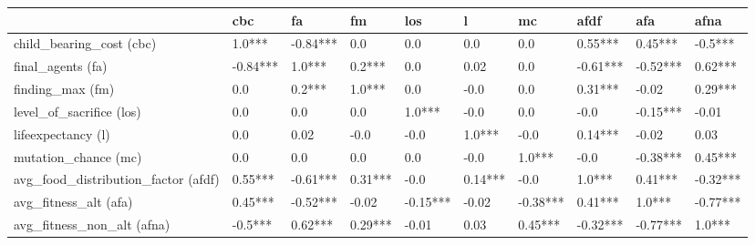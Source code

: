\begin{tabular}{llllllllll}
    \toprule
    {}                                     & cbc      & fa       & fm      & los      & l       & mc       & afdf     & afa      & afna     \\
    \midrule
    child\_bearing\_cost (cbc)             & 1.0***   & -0.84*** & 0.0     & 0.0      & 0.0     & 0.0      & 0.55***  & 0.45***  & -0.5***  \\
    final\_agents (fa)                     & -0.84*** & 1.0***   & 0.2***  & 0.0      & 0.02    & 0.0      & -0.61*** & -0.52*** & 0.62***  \\
    finding\_max (fm)                      & 0.0      & 0.2***   & 1.0***  & 0.0      & -0.0    & 0.0      & 0.31***  & -0.02    & 0.29***  \\
    level\_of\_sacrifice (los)             & 0.0      & 0.0      & 0.0     & 1.0***   & -0.0    & 0.0      & -0.0     & -0.15*** & -0.01    \\
    lifeexpectancy (l)                     & 0.0      & 0.02     & -0.0    & -0.0     & 1.0***  & -0.0     & 0.14***  & -0.02    & 0.03     \\
    mutation\_chance (mc)                  & 0.0      & 0.0      & 0.0     & 0.0      & -0.0    & 1.0***   & -0.0     & -0.38*** & 0.45***  \\
    avg\_food\_distribution\_factor (afdf) & 0.55***  & -0.61*** & 0.31*** & -0.0     & 0.14*** & -0.0     & 1.0***   & 0.41***  & -0.32*** \\
    avg\_fitness\_alt (afa)                & 0.45***  & -0.52*** & -0.02   & -0.15*** & -0.02   & -0.38*** & 0.41***  & 1.0***   & -0.77*** \\
    avg\_fitness\_non\_alt (afna)          & -0.5***  & 0.62***  & 0.29*** & -0.01    & 0.03    & 0.45***  & -0.32*** & -0.77*** & 1.0***   \\
    \bottomrule
\end{tabular}
